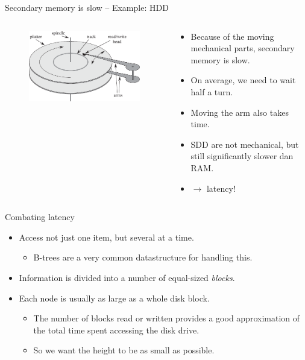 \documentclass[11pt,t]{beamer}
\begin{document}
	\begin{frame}{Secondary memory is slow -- Example: HDD}
		\begin{columns}
			\begin{column}{.4\textwidth}
				\centering
				\begin{figure}
					\includegraphics[width=\columnwidth]{images/disk}
				\end{figure}
			\end{column}
			\begin{column}{.6\textwidth}
				\begin{itemize}[<+->]
					\item Because of the moving mechanical parts, secondary memory is slow.
					\item On average, we need to wait half a turn.
					\item Moving the arm also takes time.
					\item SDD are not mechanical, but still significantly slower dan RAM.
					\item[]\(\rightarrow\) latency!
				\end{itemize}
			\end{column}
		\end{columns}
	\end{frame}

	\begin{frame}{Combating latency}
		\begin{itemize}[<+->]
			\item Access not just one item, but several at a time.
			\begin{itemize}
				\item B-trees are a very common datastructure for handling this.
			\end{itemize}
			\item Information is divided into a number of equal-sized \textit{blocks}.
			\item Each node is usually as large as a whole disk block.
			\begin{itemize}[<+->]
				\item The number of blocks read or written provides a good approximation of the total time spent accessing the disk drive.
				\item So we want the height to be as small as possible.
			\end{itemize}
		\end{itemize}
	\end{frame}
\end{document}
